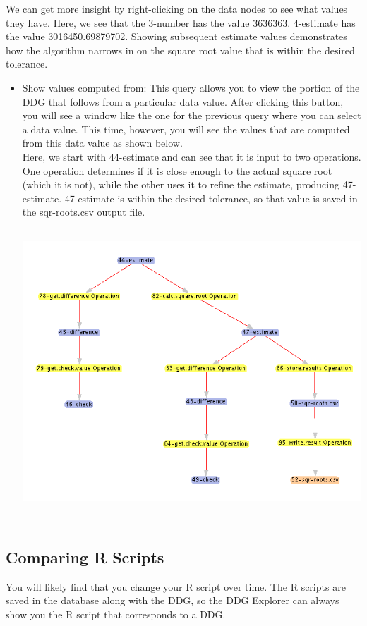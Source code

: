 \documentclass[12pt]{article}
\newcommand\liststyleWWviiiNumv{%
\renewcommand\labelitemi{•}
\renewcommand\labelitemii{•}
\renewcommand\labelitemiii{•}
\renewcommand\labelitemiv{•}
}
\begin{document}
{\begin{itemize}
{We can get more insight by right-clicking on the data nodes to see what values they have. Here, we see that the 3-number has the value 3636363. 4-estimate has the value 3016450.69879702. Showing subsequent estimate values demonstrates how the algorithm narrows in on the square root value that is within the desired tolerance.}
\end{itemize}
\liststyleWWviiiNumv
\begin{itemize}
\item {\color{black}
Show values computed from: This query allows you to view the portion of the DDG that follows from a particular data value. After clicking this button, you will see a window like the one for the previous query where you can select a data value. This time, however, you will see the values that are computed from this data value as shown below.\\
Here, we start with 44-estimate and can see that it is input to two operations. One operation determines if it is close enough to the actual square root (which it is not), while the other uses it to refine the estimate, producing 47-estimate. 47-estimate is within the desired tolerance, so that value is saved in the sqr-roots.csv output file. \includegraphics[width=5.8335in,height=4.4909in]{UsingDDGExplorer-img/UsingDDGExplorer-img009.png} }
\end{itemize}
\subsection{Comparing R Scripts}
{\mdseries\upshape\color{black}
You will likely find that you change your R script over time. The R scripts are saved in the database along with the DDG, so the DDG Explorer can always show you the R script that corresponds to a DDG.}

}
\end{document}

